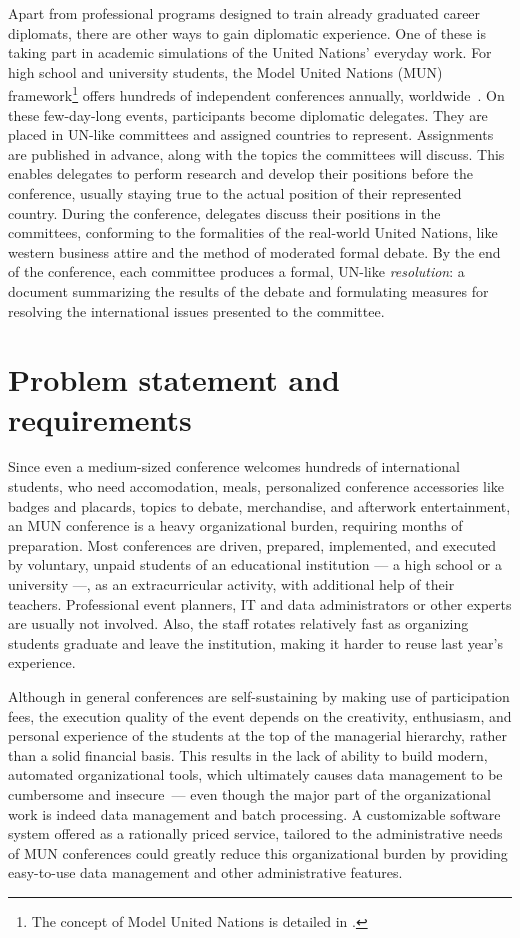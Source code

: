 Apart from professional programs designed to train already graduated career diplomats, there are other ways to gain diplomatic experience. One of these is taking part in academic simulations of the United Nations' everyday work. For high school and university students, the Model United Nations (MUN) framework\footnote{The concept of Model United Nations is detailed in .} offers hundreds of independent conferences annually, worldwide~\cite{mymunconferencelist}. On these few-day-long events, participants become diplomatic delegates. They are placed in UN-like committees and assigned countries to represent. Assignments are published in advance, along with the topics the committees will discuss. This enables delegates to perform research and develop their positions before the conference, usually staying true to the actual position of their represented country. During the conference, delegates discuss their positions in the committees, conforming to the formalities of the real-world United Nations, like western business attire and the method of moderated formal debate. By the end of the conference, each committee produces a formal, UN-like \emph{resolution}: a document summarizing the results of the debate and formulating measures for resolving the international issues presented to the committee.

\section{Problem statement and requirements}

Since even a medium-sized conference welcomes hundreds of international students, who need accomodation, meals, personalized conference accessories like badges and placards, topics to debate, merchandise, and afterwork entertainment, an MUN conference is a heavy organizational burden, requiring months of preparation. Most conferences are driven, prepared, implemented, and executed by voluntary, unpaid students of an educational institution — a high school or a university —, as an extracurricular activity, with additional help of their teachers. Professional event planners, IT and data administrators or other experts are usually not involved. Also, the staff rotates relatively fast as organizing students graduate and leave the institution, making it harder to reuse last year's experience.

Although in general conferences are self-sustaining by making use of participation fees, the execution quality of the event depends on the creativity, enthusiasm, and personal experience of the students at the top of the managerial hierarchy, rather than a solid financial basis. This results in the lack of ability to build modern, automated organizational tools, which ultimately causes data management to be cumbersome and insecure — even though the major part of the organizational work is indeed data management and batch processing. A customizable software system offered as a rationally priced service, tailored to the administrative needs of MUN conferences could greatly reduce this organizational burden by providing easy-to-use data management and other administrative features.

